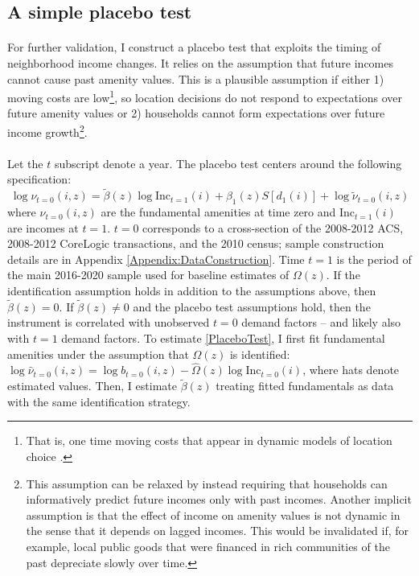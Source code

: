 \documentclass[12pt]{article}
\begin{document}
\subsection{A simple placebo test} 
\paragraph*{}
For further validation, I construct a placebo test that exploits the timing of neighborhood income changes. It relies on the assumption that future incomes cannot cause past amenity values. This is a plausible assumption if either 1) moving costs are low\footnote{That is, one time moving costs that appear in dynamic models of location choice \citep{CaliendoDvorkinParro, BMMT}.}, so location decisions do not respond to expectations over future amenity values or 2) households cannot form expectations over future income growth\footnote{This assumption can be relaxed by instead requiring that households can informatively predict future incomes only with past incomes. Another implicit assumption is that the effect of income on amenity values is not dynamic in the sense that it depends on lagged incomes. This would be invalidated if, for example, local public goods that were financed in rich communities of the past depreciate slowly over time.}. 
\paragraph*{}
Let the $t$ subscript denote a year. The placebo test centers around the following specification:
\begin{equation}\label{PlaceboTest}
 	\log \nu_{t = 0}(i, z) =  \tilde{\beta}(z)\log\text{Inc}_{t = 1}(i) + \beta_{1}(z)S[d_{1}(i)] + \log \tilde{\nu}_{t = 0}(i, z)
\end{equation}
where $\nu_{t = 0}(i, z)$ are the fundamental amenities at time zero and $\text{Inc}_{t = 1}(i)$ are incomes at $t = 1$. $t = 0$ corresponds to a cross-section of the 2008-2012 ACS, 2008-2012 CoreLogic transactions, and the 2010 census; sample construction details are in Appendix \ref{Appendix:DataConstruction}. Time $t = 1$ is the period of the main 2016-2020 sample used for baseline estimates of $\Omega(z)$. If the identification assumption holds in addition to the assumptions above, then  $\tilde{\beta}(z) = 0$. If $\tilde{\beta}(z) \neq 0$ and the placebo test assumptions hold, then the instrument is correlated with unobserved $t = 0$ demand factors -- and likely also with $t=1$ demand factors.   To estimate \eqref{PlaceboTest}, I first fit fundamental amenities under the assumption that $\Omega(z)$ is identified: $\log \hat{\nu}_{t = 0}(i, z) = \log b_{t = 0}(i, z) - \hat{\Omega}(z)\log \text{Inc}_{t = 0}(i)$, where hats denote estimated values. Then, I estimate $\tilde{\beta}(z)$ treating fitted fundamentals as data with the same identification strategy. 
\end{document}
